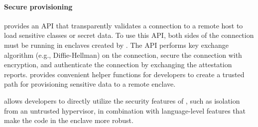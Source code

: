 


\paragraph{Secure provisioning}
\sysname{} provides an API that transparently validates a connection to a remote host to load
sensitive classes or secret data.
To use this API, both sides of the connection
must be running in enclaves created by \sysname{}.
The API performs key exchange algorithm (e.g., Diffie-Hellman) on the connection,
secure the connection with encryption,
and authenticate the connection by exchanging the attestation reports.
\sysname{} provides convenient helper functions for developers to create a trusted path
for provisioning sensitive data to a remote enclave.


\label{sec:security}

\sysname{} %
allows \java{} developers to directly utilize the security features of \sgx{}, such as isolation from an untrusted hypervisor, %
in combination with language-level features that make the code in the enclave more robust.

